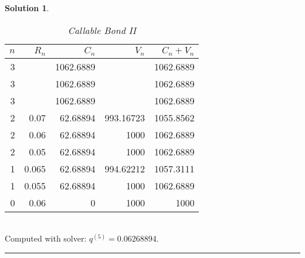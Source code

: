 \documentclass[a4paper, 10pt]{article}
\renewcommand{\arraystretch}{1.4}
\theoremstyle{definition}
\theoremstyle{hSol}
\newtheorem*{solution}{Solution}
\begin{document}
\begin{solution}
\begin{table}[htbp]
  \centering
    \caption{\textit{Callable Bond II}}
  \vspace{-7pt}
  \def\arraystretch{1.15}
    \begin{tabular}{|r|rrrr|}
    \hline
    $n$ & $R_n$ & $C_n$ & $V_n$ & $C_n+V_n$\\
     \hline
    3     &       & 1062.6889 &       & 1062.6889 \\
    3     &       & 1062.6889 &       & 1062.6889 \\
    3     &       & 1062.6889 &       & 1062.6889 \\
    2     & 0.07  & 62.68894 & 993.16723 & 1055.8562 \\
    2     & 0.06  & 62.68894 & 1000  & 1062.6889 \\
    2     & 0.05  & 62.68894 & 1000  & 1062.6889 \\
    1     & 0.065 & 62.68894 & 994.62212 & 1057.3111 \\
    1     & 0.055 & 62.68894 & 1000  & 1062.6889 \\
    \hline
    0     & 0.06  & 0     & 1000  & 1000 \\
    \hline
    \end{tabular}%
  \label{tab:cb2}%
\end{table}%
~\\
Computed with solver: $q^{(5)} = 0.06268894$.


\end{solution}

\noindent\rule{16cm}{0.4pt}
\end{document}
